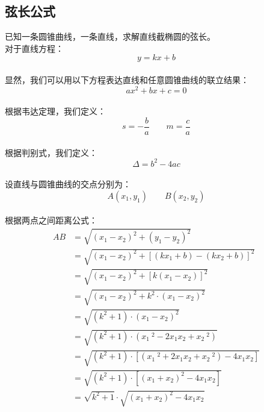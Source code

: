 \documentclass[UTF8]{ctexart}
\begin{document}
\subsection{弦长公式}
    已知一条圆锥曲线，一条直线，求解直线截椭圆的弦长。\\[3mm]
    对于直线方程：
    \setcounter{equation}{0}
    \begin{equation}
        y=kx+b
    \end{equation}\\
    显然，我们可以用以下方程表达直线和任意圆锥曲线的联立结果：
    \begin{equation}
        ax^2+bx+c=0
    \end{equation}\\
    根据韦达定理，我们定义：
    \begin{equation}
        s=-\frac{b}{a}\qquad m=\frac{c}{a}
    \end{equation}\\
    根据判别式，我们定义：
    \begin{equation}
        \Delta=b^2-4ac
    \end{equation}\\[1mm]
    设直线与圆锥曲线的交点分别为：
    \begin{equation}
        A(x_1,y_1)\qquad B(x_2,y_2)
    \end{equation}\\
    根据两点之间距离公式：
    \begin{align}
        AB&=\sqrt{(x_1-x_2)^2+(y_1-y_2)^2}\\[3mm]
        &=\sqrt{(x_1-x_2)^2+\left[(kx_1+b)-(kx_2+b)\right]^2}\\[3mm]
        &=\sqrt{(x_1-x_2)^2+\left[k(x_1-x_2)\right]^2}\\[3mm]
        &=\sqrt{(x_1-x_2)^2+k^2\cdot(x_1-x_2)^2}\\[3mm]
        &=\sqrt{(k^2+1)\cdot(x_1-x_2)^2}\\[3mm]
        &=\sqrt{(k^2+1)\cdot(x_1~^2-2x_1x_2+x_2~^2)}\\[3mm]
        &=\sqrt{(k^2+1)\cdot\left[(x_1~^2+2x_1x_2+x_2~^2)-4x_1x_2\right]}\\[3mm]
        &=\sqrt{(k^2+1)\cdot\left[(x_1+x_2)^2-4x_1x_2\right]}\\[3mm]
        &=\sqrt{k^2+1}\cdot\sqrt{(x_1+x_2)^2-4x_1x_2}
    \end{align}

\newpage
\end{document}
